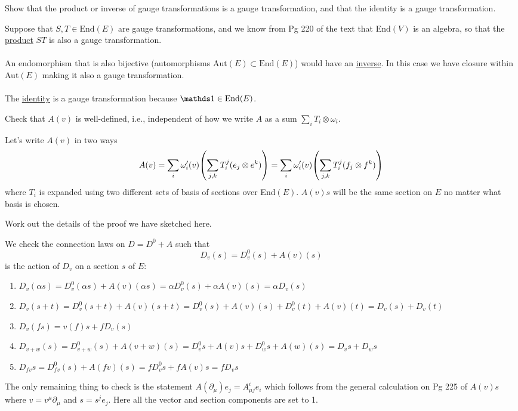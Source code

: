 \documentclass[10pt]{article}
\begin{document}
\begin{example}
	Show that the product or inverse of gauge transformations is a gauge transformation, and that the identity is a gauge transformation.
\end{example}
\sol Suppose that $S,T \in \text{End}(E)$ are gauge transformations, and we know from Pg 220 of the text that End$(V)$ is an algebra, so that the \underline{product} $ST$ is also a gauge transformation.\\\\
An endomorphism that is also bijective (automorphisms $\text{Aut}(E) \subset \text{End}(E)$) would have an \underline{inverse}. In this case we have closure within Aut$(E)$ making it also a gauge transformation.\\\\
The \underline{identity} is a gauge transformation because $\id \in \text{End}(E)$.


\begin{example}
	Check that $A(v)$ is well-defined, i.e., independent of how we write $A$ as a sum $\sum_i T_i \otimes \omega_i$.
\end{example}
\sol Let's write $A(v)$ in two ways
$$
A(v) = \sum_i \omega_i^\prime(v) \p*{\sum_{j,k} T_i^j (e_j \otimes e^k)} = \sum_i \omega_i^\prime(v) \p*{\sum_{j,k} T_i^j (f_j \otimes f^k)}
$$
where $T_i$ is expanded using two different sets of basis of sections over End$(E)$. $A(v)s$ will be the same section on $E$ no matter what basis is chosen.


\begin{example}
	Work out the details of the proof we have sketched here.
\end{example}
\sol We check the connection laws on $D=D^0+A$ such that
$$
D_v(s) = D_v^0(s) + A(v)(s)
$$
is the action of $D_v$ on a section $s$ of $E$:
\begin{enumerate}
	\item $D_v(\alpha s) = D_v^0(\alpha s) + A(v)(\alpha s) = \alpha D_v^0(s) + \alpha A(v)(s) = \alpha D_v(s)$
	\item $D_v(s + t) = D_v^0(s+t) + A(v)(s+t) = D_v^0(s) + A(v)(s) + D_v^0(t) + A(v)(t) = D_v(s) + D_v(t)$
	\item $D_v(fs) = v(f)s+fD_v(s)$
	\item $D_{v+w}(s) = D_{v+w}^0(s) + A(v+w)(s) = D_v^0s + A(v)s + D_w^0s + A(w)(s) = D_vs + D_ws$
	\item $D_{fv}s = D_{fv}^0(s) + A(fv)(s) = fD_v^0s + fA(v)s = fD_vs$
\end{enumerate}
The only remaining thing to check is the statement $A(\partial_\mu)e_j = A_{\mu j}^i e_i$ which follows from the general calculation on Pg 225 of $A(v)s$ where $v=v^\mu \partial_\mu$ and $s=s^j e_j$. Here all the vector and section components are set to 1.
\end{document}
